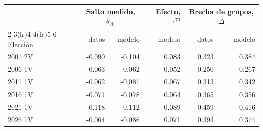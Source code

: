 \begin{tabular}{lrrrrr}
\toprule
 & \multicolumn{2}{c}{Salto medido, $\theta_{70}$} & Efecto, $\tau^{70}$ & \multicolumn{2}{c}{Brecha de grupos, $\Delta$} \\
\cmidrule(lr){2-3}\cmidrule(lr){4-4}\cmidrule(lr){5-6}
Elección & datos & modelo & modelo & datos & modelo \\
\midrule
2001 2V & -0.090 & -0.104 & 0.083 & 0.323 & 0.384 \\
2006 1V & -0.063 & -0.062 & 0.052 & 0.250 & 0.267 \\
2011 1V & -0.062 & -0.081 & 0.067 & 0.313 & 0.342 \\
2016 1V & -0.071 & -0.078 & 0.064 & 0.365 & 0.356 \\
2021 1V & -0.118 & -0.112 & 0.089 & 0.459 & 0.416 \\
2026 1V & -0.064 & -0.086 & 0.071 & 0.393 & 0.374 \\
\bottomrule
\end{tabular}